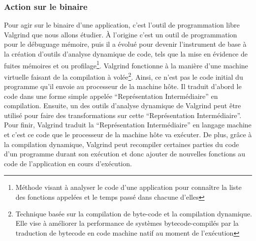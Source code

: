\subsubsection{Action sur le binaire}
Pour agir sur le binaire d'une application, c'est l'outil de programmation libre
Valgrind\cite{INTERCEPTION:Valgrind, INTERCEPTION:Valgrind_web} que nous allons
étudier. À l'origine c'est un outil de programmation pour le débuguage mémoire,
puis il a évolué pour devenir l'instrument de base à la création d'outils
d'analyse dynamique de code, tels que la mise en évidence de fuites mémoires et
ou profilage\footnote{Méthode visant à analyser le code d'une
  application pour connaître la liste des fonctions appelées et le temps passé
  dans chacune d'elles}. Valgrind fonctionne à la manière d'une machine
virtuelle faisant de la compilation à volée\footnote{Technique basée sur la
  compilation de byte-code et la compilation dynamique. Elle vise à améliorer la
  performance de systèmes bytecode-compilés par la traduction de bytecode en
  code machine natif au moment de l'exécution}. Ainsi, ce n'est pas le code
initial du programme qu'il envoie au processeur de la machine hôte. Il traduit
d'abord le code dans une forme simple appelée ``Représentation Intermédiaire''
en compilation. Ensuite, un des outils d'analyse dynamique de Valgrind peut être
utilisé pour faire des transformations sur cette ``Représentation
Intermédiaire''. Pour finir, Valgrind traduit la ``Représentation
Intermédiaire'' en langage machine et c'est ce code que le processeur de la
machine hôte va exécuter. De plus, grâce à la compilation dynamique, Valgrind
peut recompiler certaines parties du code d'un programme durant son exécution et
donc ajouter de nouvelles fonctions au code de l'application en cours
d'exécution.

